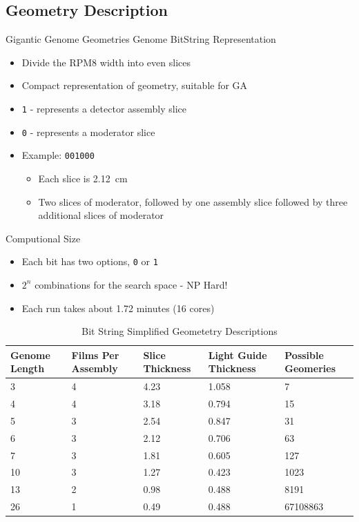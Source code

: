 \documentclass[compress]{beamer}
\begin{document}
\subsection{Geometry Description}
\begin{frame}[fragile]{Gigantic Genome Geometries}
Genome BitString Representation
\begin{itemize}
  \item Divide the RPM8 width into even slices
  \item Compact representation of geometry, suitable for GA
  \item \verb+1+ - represents a detector assembly slice
  \item \verb+0+ - represents a moderator slice
  \item Example: \verb+001000+
  \begin{itemize}
    \item Each slice is \SI{2.12}{\centi\meter}
    \item Two slices of moderator, followed by one assembly slice followed by three additional slices of moderator
  \end{itemize}
\end{itemize}
\end{frame}
\begin{frame}[fragile]{Computional Size}
\small
\begin{itemize}
  \item Each bit has two options, \verb+0+ or \verb+1+
  \item $2^n$ combinations for the search space - NP Hard!
  \item Each run takes about 1.72 minutes (16 cores)
\end{itemize}
\begin{table}
    \caption[Genome Bit String Geometries]{Bit String Simplified Geometetry Descriptions}
    \label{tab:BitStringGeo}
    \centering
    \tiny
    \begin{tabular}{ m{1.5cm} | m{1.5cm} m{1.5cm} m{1.5cm}  m{1.5cm}}
      Genome Length&Films Per Assembly&Slice Thickness&Light Guide Thickness&Possible Geomeries \\
      \hline
      \hline
      3&4&4.23&1.058&7 \\
      4&4&3.18&0.794&15 \\
      5&3&2.54&0.847&31 \\
      6&3&2.12&0.706&63 \\
      7&3&1.81&0.605&127 \\ 
      10&3&1.27&0.423&1023 \\
      13&2&0.98&0.488&8191 \\
      26&1&0.49&0.488&67108863 \\
    \end{tabular}
\end{table}
\end{frame}
\end{document}
